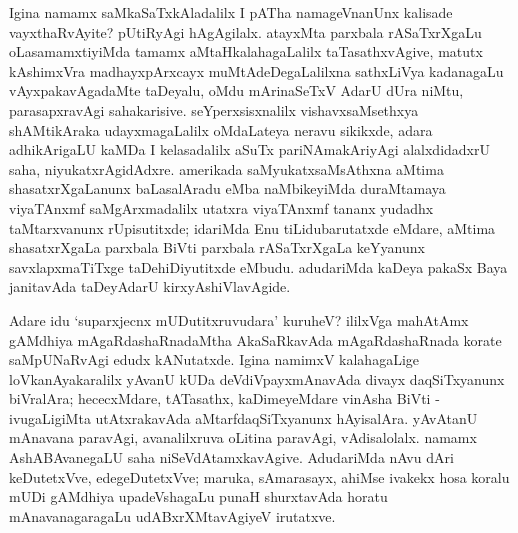 \newpage

Igina namamx saMkaSaTxkAladalilx I pATha namageVnanUnx kalisade vayxthaRvAyite? pUtiRyAgi hAgAgilalx. atayxMta parxbala rASaTxrXgaLu oLasamamxtiyiMda tamamx aMtaHkalaha\-gaLalilx taTasathxvAgive, matutx kAshimxVra madhayxpArxcayx muMtAdeDegaLalilxna sathxLiVya kadanagaLu vAyxpakavAgadaMte taDeyalu, oMdu mArinaSeTxV AdarU dUra niMtu, parasapxravAgi sahakarisive. seYperxsisxnalilx vishavxsaMsethxya shAMtikAraka udayxmagaLalilx oMdaLateya neravu sikikxde, adara adhikArigaLU kaMDa I kelasadalilx aSuTx pariNAmakAriyAgi alalxdidadxrU saha, niyukatxrAgidAdxre. amerikada saMyukatxsaMsAthxna aMtima shasatxrXgaLanunx baLasalAradu eMba naMbikeyiMda duraMtamaya viyaTAnxmf saMgArxmadalilx utatxra viyaTAnxmf tananx yudadhx taMtarxvanunx rUpisutitxde; idariMda Enu tiLidubarutatxde eMdare, aMtima shasatxrXgaLa parxbala BiVti parxbala rASaTxrXgaLa keYyanunx savxlapxmaTiTxge taDehiDiyutitxde eMbudu. adudariMda kaDeya pakaSx Baya janitavAda taDeyAdarU kirxyAshiVlavAgide. 

Adare idu `suparxjecnx mUDutitxruvudara' kuruheV? ililxVga mahAtAmx gAMdhiya mAgaRdashaRnadaMtha AkaSaRkavAda mAgaRdashaRnada korate saMpUNaRvAgi edudx kANutatxde. Igina namimxV kalahagaLige loVkanAyakaralilx yAvanU kUDa deVdiVpayxmAnavAda divayx daqSiTxyanunx biVralAra; hececxMdare, tATasathx, kaDimeyeMdare vinAsha BiVti - ivugaLigiMta utAtxrakavAda aMtarfdaqSiTxyanunx hAyisalAra. yAvAtanU mAnavana paravAgi, avanalilxruva oLitina paravAgi, vAdisalolalx. namamx AshABAvanegaLU saha niSeVdAtamxkavAgive. AdudariMda nAvu dAri keDutetxVve, edegeDutetxVve; maruka, sAmarasayx, ahiMse ivakekx hosa koralu mUDi gAMdhiya upadeVshagaLu punaH shurxtavAda horatu mAnavanagaragaLu udABxrXMtavAgiyeV irutatxve.



